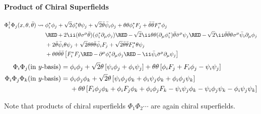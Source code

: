 
\paragraph{Product of Chiral Superfields}
\begin{align}
\Phi^\dagger_i\Phi_j(x,\theta,\btheta)
\leadsto{}
   & \phi^*_i\phi_j
       + \sqrt2\phi^*_i\theta\psi_j + \sqrt2\btheta\bar\psi_i\phi_j
       + \thth \phi^*_iF_j + \bthth F^*_i\phi_j\notag\\
   & {\RED\,+\,} 2\ii(\theta\Sm\btheta)(\phi^*_i\Pm\phi_j)
       {\RED\,-\,} \sqrt2\ii\thth(\Pm\phi^*_i)\btheta\bSm\psi_j
       {\RED\,-\,} \sqrt2\ii\bthth\theta\Sm\bar\psi_i\Pm\phi_j\notag\\
   & + 2\btheta\bar\psi_i\theta\psi_j
       + \sqrt2\thth \btheta\bar\psi_i F_j
       + \sqrt2\bthth F^*_i\theta\psi_j\notag\\
   & + \thth\bthth\left[
        F^*_iF_j {\RED\,-\,} \Pmu\phi^*_i\Pm\phi_j {\RED\,-\,} \ii\bar\psi_i\bSm\Pm\psi_j\right]
\end{align}
\begin{align}
\Phi_i\Phi_j\text{(in $y$-basis)}
={}& \phi_i\phi_j+\sqrt2\theta\left[\psi_i\phi_j+\phi_i\psi_j\right]
     +{\theta\theta}\left[\phi_iF_j+F_i\phi_j-\psi_i\psi_j\right]\\
\Phi_i\Phi_j\Phi_k\text{(in $y$-basis)}
={}& \phi_i\phi_j\phi_k
     + \sqrt2\theta\left[\psi_i\phi_j\phi_k
                        +\phi_i\psi_j\phi_k
                        +\phi_i\phi_j\psi_k\right]\notag\\
   & +{\theta\theta}\left[
      F_i\phi_j\phi_k+\phi_iF_j\phi_k+\phi_i\phi_jF_k
      -\psi_i\psi_j\phi_k-\psi_i\phi_j\psi_k
      -\phi_i\psi_j\psi_k
      \right]
\end{align}

Note that products of chiral superfields $\Phi_1\Phi_2\cdots$ are again
chiral superfields.


